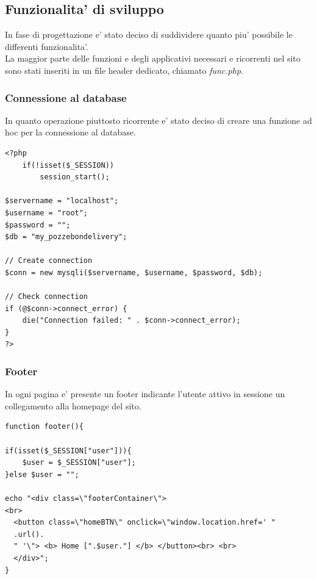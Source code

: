 \documentclass[a4paper, 12pt]{report}
\begin{document}
\subsection{Funzionalita' di sviluppo}
In fase di progettazione e’ stato deciso di suddividere quanto piu’ possibile le differenti funzionalita’. \\
La maggior parte delle funzioni e degli applicativi necessari e ricorrenti nel sito sono stati inseriti in un file header dedicato, chiamato \textit{func.php}.
\subsubsection{Connessione al database}
In quanto operazione piuttosto ricorrente e' stato deciso di creare una funzione ad hoc per la connessione al database.
\begin{lstlisting}[caption=\textit{connect()}]
<?php
    if(!isset($_SESSION))
        session_start();

$servername = "localhost";
$username = "root";
$password = "";
$db = "my_pozzebondelivery";

// Create connection
$conn = new mysqli($servername, $username, $password, $db);

// Check connection
if (@$conn->connect_error) {
    die("Connection failed: " . $conn->connect_error);
}																													
?> 
\end{lstlisting}

\subsubsection{Footer}
In ogni pagina e’ presente un footer indicante l’utente attivo in sessione un collegamento alla homepage del sito.

\begin{lstlisting}[caption=\textit{footer()}]
function footer(){

if(isset($_SESSION["user"])){
    $user = $_SESSION["user"]; 
}else $user = "";

echo "<div class=\"footerContainer\">
<br>
  <button class=\"homeBTN\" onclick=\"window.location.href=' "
  .url().
  " '\"> <b> Home [".$user."] </b> </button><br> <br>
  </div>";
}
            
\end{lstlisting}
\end{document}
